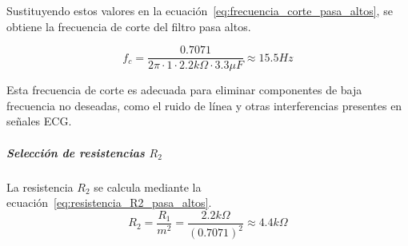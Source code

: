                     Sustituyendo estos valores en la ecuación~\ref{eq:frecuencia_corte_pasa_altos}, se obtiene la frecuencia de corte del filtro pasa altos.

                    \begin{equation}
                        \label{eq:frecuencia_corte_pasa_altos_valor}
                        f_c = \frac{0.7071}{2\pi \cdot 1 \cdot 2.2 k\Omega \cdot 3.3 \mu F} \approx 15.5 Hz
                    \end{equation}

                    Esta frecuencia de corte es adecuada para eliminar componentes de baja frecuencia no deseadas, como el ruido de línea y otras interferencias presentes en señales ECG.

                \subparagraph{Selección de resistencias $R_2$}
                    La resistencia $R_2$ se calcula mediante la ecuación~\ref{eq:resistencia_R2_pasa_altos}.
                    \begin{equation}
                        \label{eq:resistencia_R2_pasa_altos}
                        R_2 = \frac{R_1}{m^2} = \frac{2.2 k\Omega}{(0.7071)^2} \approx 4.4 k\Omega 
                    \end{equation}
            
